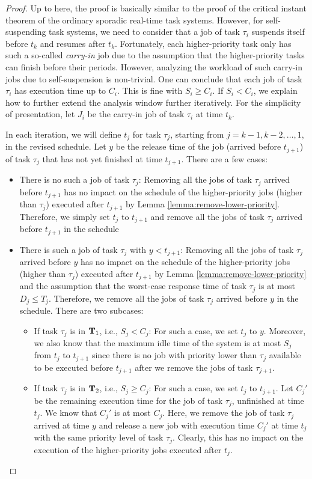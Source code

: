 \begin{proof}
Up to here, the proof is basically similar to the proof of the critical instant theorem of the ordinary sporadic real-time task systems. However, for self-suspending task systems, we need to consider that a job of task $\tau_i$ suspends itself before $t_k$ and resumes after $t_k$.  Fortunately, each higher-priority task only has such a so-called \emph{carry-in} job due to the assumption that the higher-priority tasks can finish before their periods. However, analyzing the workload of such carry-in jobs due to self-suspension is non-trivial. One can conclude that each job of task $\tau_i$ has execution time up to $C_i$. This is fine with $S_i \geq C_i$. If $S_i < C_i$, we explain how to further extend the analysis window further iteratively. For the simplicity of presentation, let $J_i$ be the carry-in job of task $\tau_i$ at time $t_k$.


In each iteration, we will define $t_j$ for task $\tau_j$, starting from $j=k-1, k-2, \ldots, 1$, in the revised schedule. Let $y$ be the release time of the job (arrived before $t_{j+1}$) of task $\tau_j$ that has not yet finished at time $t_{j+1}$. There are a few cases:
\begin{itemize}
\item There is no such a job of task $\tau_j$: Removing all the jobs of task $\tau_j$ arrived before $t_{j+1}$ has no impact on the schedule of the higher-priority jobs (higher than $\tau_j$) executed after $t_{j+1}$ by Lemma \ref{lemma:remove-lower-priority}. Therefore, we simply set $t_j$ to $t_{j+1}$ and remove all the jobs of task $\tau_j$ arrived before $t_{j+1}$ in the schedule
\item There is such a job of task $\tau_j$ with $y < t_{j+1}$:  Removing all the jobs of task $\tau_j$ arrived before $y$ has no impact on the schedule of the higher-priority jobs (higher than $\tau_j$) executed after $t_{j+1}$ by Lemma \ref{lemma:remove-lower-priority} and the assumption that the worst-case response time of task $\tau_j$ is at most $D_j \leq T_j$. Therefore, we remove all the jobs of task $\tau_j$ arrived before $y$ in the schedule. There are two subcases:
\begin{itemize}
\item If task $\tau_j$ is in ${\bf T}_1$, i.e., $S_j < C_j$: For such a case, we set $t_{j}$ to $y$. Moreover, we also know that the maximum idle time of the system is at most $S_j$ from $t_j$ to $t_{j+1}$ since there is no job with priority lower than $\tau_j$ available to be executed before $t_{j+1}$ after we remove the jobs of task $\tau_{j+1}$.
\item If task $\tau_j$ is in ${\bf T}_2$, i.e., $S_j \geq C_j$: For such a case, we set $t_{j}$ to $t_{j+1}$. Let $C_j'$ be the remaining execution time for the job of task $\tau_j$, unfinished at time $t_j$. We know that $C_j'$ is at most $C_j$. Here, we remove the job of task $\tau_j$ arrived at time $y$ and release a new job with execution time $C_j'$  at time $t_j$ with the same priority level of task $\tau_j$. Clearly, this has no impact on the execution of the higher-priority jobs executed after $t_j$.
\end{itemize}
\end{itemize}
 

\end{proof}
